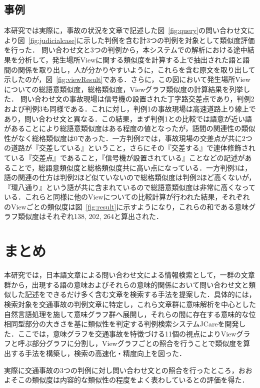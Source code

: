 \subsection{事例}
本研究では実際に，事故の状況を文章で記述した図~\ref{fig:query}の問い合わせ文により図~\ref{fig:judicialcase}に示した判例を含む計3つの判例を対象として類似度評価を行った．
問い合わせ文と3つの判例から，本システムでの解析における途中結果を分析して，発生場所Viewに関する類似度を計算する上で抽出された語と語間の関係を取り出し，人が分かりやすいように，これらを含む原文を取り出して示したのが，図~\ref{fig:viewResult}である．さらに，この図において発生場所Viewについての総語意類似度，総格類似度，Viewグラフ類似度の計算結果を列挙した．
問い合わせ文の事故現場は信号機の設置された丁字路交差点であり，判例2および判例3も同様である．これに対し，判例1の事故現場は高速道路上り線上であり，問い合わせ文と異なる．この結果，まず判例1との比較では語意が近い語があることにより総語意類似度はある程度の値となったが，語間の関連性の類似性がなく総格類似度は0であった．一方判例2では，事故現場の交差点が共に2つの道路が『交差している』ということ，さらにその『交差する』で連体修飾されている『交差点』であること，『信号機が設置されている』ことなどの記述があることで，総語意類似度と総格類似度共に高い点になっている．一方判例3は，語の関連の仕方は判例2ほど似ていないので総格類似度は判例2ほど高くないが，『環八通り』という語が共に含まれているので総語意類似度は非常に高くなっている．これらと同様に他のViewについての比較計算が行われた結果，それぞれのViewごとの類似度は図~\ref{fig:result}に示すようになり，これらの和である意味グラフ類似度はそれぞれ138, 202, 264と算出された．

\section{まとめ}
本研究では，日本語文章による問い合わせ文による情報検索として，一群の文章群から，出現する語の意味およびそれらの意味的関係において問い合わせ文と類似した記述をできるだけ多く含む文章を検索する手法を提案した．具体的には，検索対象を交通事故の判例文章に特定し，これら文章群に意味解析を中心とした自然言語処理を施して意味グラフ群へ展開し，それらの間に存在する意味的な位相同型部分の大きさを基に類似性を判定する判例検索システムJCareを開発した．ここでは，意味グラフを交通事故を特徴づける11個の視点によりViewグラフと呼ぶ部分グラフに分割し，Viewグラフごとの照合を行うことで類似度を算出する手法を構築し，検索の高速化・精度向上を図った．

実際に交通事故の3つの判例に対し問い合わせ文との照合を行ったところ，おおよそこの類似度は内容的な類似性の程度をよく表わしているとの評価を得た．

